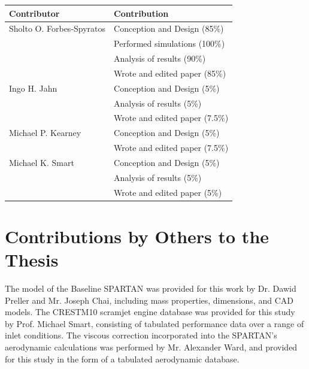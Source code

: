 \begin{center}
  \begin{tabular}{ll}
    \toprule
    Contributor   & Contribution \\
    \midrule
    Sholto O. Forbes-Spyratos             
                                  & Conception and Design (85\%)\\
                                  & Performed simulations (100\%)\\
                                  & Analysis of results (90\%)\\
                                  & Wrote and edited paper (85\%)\\
    \midrule
    Ingo H. Jahn            
                                  & Conception and Design (5\%)\\
                                  & Analysis of results (5\%)\\
                                  & Wrote and edited paper (7.5\%)\\
                                  
        \midrule
        Michael P. Kearney            
								      & Conception and Design (5\%)\\
								      & Wrote and edited paper (7.5\%)\\                       

    \midrule
    Michael K. Smart              
                                  & Conception and Design (5\%)\\
                                  & Analysis of results (5\%)\\
                                  & Wrote and edited paper (5\%)\\
    \bottomrule
  \end{tabular}
\end{center}



\section*{Contributions by Others to the Thesis}

The model of the Baseline SPARTAN was provided for this work by Dr. Dawid Preller and Mr. Joseph Chai, including mass properties, dimensions, and CAD models. The CRESTM10 scramjet engine database was provided for this study by Prof. Michael Smart, consisting of tabulated performance data over a range of inlet conditions. The viscous correction incorporated into the SPARTAN's aerodynamic calculations was performed by Mr. Alexander Ward, and provided for this study in the form of a tabulated aerodynamic database. 




